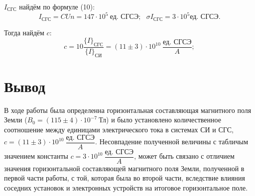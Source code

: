 \documentclass[a4paper,12pt]{article} %
\theoremstyle{plain} %
\theoremstyle{definition} %
\theoremstyle{remark} %
\begin{document}
\begin{large}
$I_\text{СГС}$ найдём по формуле (10):
\[I_\text{СГС}=CUn=147\cdot 10^5~\text{ед. СГСЭ};~~~\sigma I_{\text{СГС}}=3\cdot 10^{5} \text{ед. СГСЭ}.\] 

Тогда найдём $c:$
\[c=10\dfrac{\{I\}_\text{СГС}}{\{I\}_{\text{СИ}}}=(11\pm3)\cdot 10^{10}~\dfrac{\text{ед. СГСЭ}}{A};\]


\section{Вывод}
В ходе работы была определенна горизонтальная составляющая магнитного поля Земли ($B_0=(115\pm4)\cdot 10^{-7}~\text{Тл}$) и было установлено количественное соотношение между
единицами электрического тока в системах СИ и СГС, $c=(11\pm3)\cdot 10^{10}~\dfrac{\text{ед. СГСЭ}}{A}.$ Несовпадение полученной величины с табличым значением константы $c=3\cdot 10^{10}~\dfrac{\text{ед. СГСЭ}}{A}$, может быть связано с отличием значения горизонтальной составляющей магнитного поля Земли, полученной в первой части работы, с той, которая была во второй части, вследствие влияния соседних установок и электронных устройств на итоговое горизонтальное поле.

\end{large}
\end{document}
